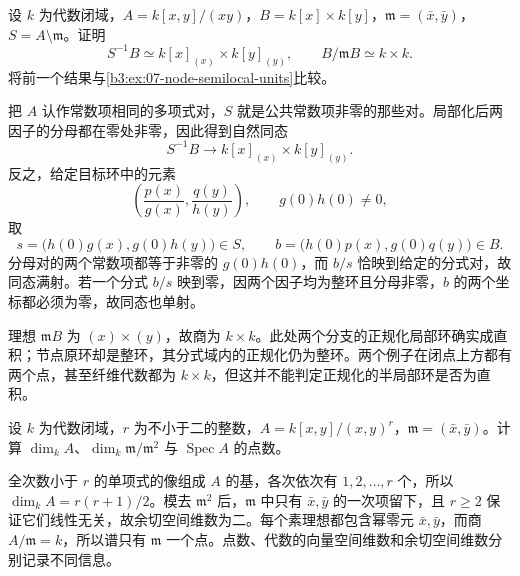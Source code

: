 \begin{exercise}\label{b3:ex:07-crossing-versus-node}
	设 \(k\) 为代数闭域，\(A=k[x,y]/(xy)\)，\(B=k[x]\times k[y]\)，\(\mathfrak m=(\bar x,\bar y)\)，\(S=A\setminus\mathfrak m\)。证明
	\[
		S^{-1}B\simeq k[x]_{(x)}\times k[y]_{(y)},\qquad B/\mathfrak mB\simeq k\times k.
	\]
	将前一个结果与\cref{b3:ex:07-node-semilocal-units}比较。
\end{exercise}
\begin{solution}
	把 \(A\) 认作常数项相同的多项式对，\(S\) 就是公共常数项非零的那些对。局部化后两因子的分母都在零处非零，因此得到自然同态
	\[
		S^{-1}B\longrightarrow k[x]_{(x)}\times k[y]_{(y)}.
	\]
	反之，给定目标环中的元素
	\[
		\left(\dfrac{p(x)}{g(x)},\dfrac{q(y)}{h(y)}\right), \qquad g(0)h(0)\ne0,
	\]
	取
	\[
		s=\bigl(h(0)g(x),g(0)h(y)\bigr)\in S,\qquad b=\bigl(h(0)p(x),g(0)q(y)\bigr)\in B.
	\]
	分母对的两个常数项都等于非零的 \(g(0)h(0)\)，而 \(b/s\) 恰映到给定的分式对，故同态满射。若一个分式 \(b/s\) 映到零，因两个因子均为整环且分母非零，\(b\) 的两个坐标都必须为零，故同态也单射。

	理想 \(\mathfrak mB\) 为 \((x)\times(y)\)，故商为 \(k\times k\)。此处两个分支的正规化局部环确实成直积；节点原环却是整环，其分式域内的正规化仍为整环。两个例子在闭点上方都有两个点，甚至纤维代数都为 \(k\times k\)，但这并不能判定正规化的半局部环是否为直积。
\end{solution}

\begin{exercise}\label{b3:ex:07-fat-point-cotangent}
	设 \(k\) 为代数闭域，\(r\) 为不小于二的整数，\(A=k[x,y]/(x,y)^r\)，\(\mathfrak m=(\bar x,\bar y)\)。计算 \(\dim_k A\)、\(\dim_k\mathfrak m/\mathfrak m^2\) 与 \(\operatorname{Spec}A\) 的点数。
\end{exercise}
\begin{solution}
	全次数小于 \(r\) 的单项式的像组成 \(A\) 的基，各次依次有 \(1,2,\ldots,r\) 个，所以 \(\dim_k A=r(r+1)/2\)。模去 \(\mathfrak m^2\) 后，\(\mathfrak m\) 中只有 \(\bar x,\bar y\) 的一次项留下，且 \(r\ge2\) 保证它们线性无关，故余切空间维数为二。每个素理想都包含幂零元 \(\bar x,\bar y\)，而商 \(A/\mathfrak m=k\)，所以谱只有 \(\mathfrak m\) 一个点。点数、代数的向量空间维数和余切空间维数分别记录不同信息。
\end{solution}

